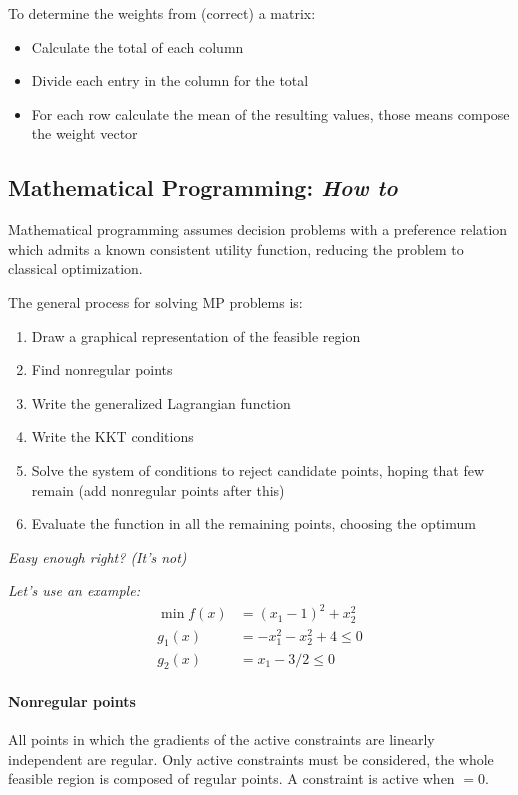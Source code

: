 To determine the weights from (correct) a matrix: 
\begin{itemize}
	\item Calculate the total of each column
	
	\item Divide each entry in the column for the total
	
	\item For each row calculate the mean of the resulting values, those means compose the weight vector
\end{itemize}

\subsection{Mathematical Programming: \textit{How to}}

Mathematical programming assumes decision problems with a preference relation which admits a known consistent utility function, reducing the problem to classical optimization. 

The general process for solving MP problems is: 
\begin{enumerate}
	\item Draw a graphical representation of the feasible region
	
	\item Find nonregular points
	
	\item Write the generalized Lagrangian function
	
	\item Write the KKT conditions
	
	\item Solve the system of conditions to reject candidate points, hoping that few remain (add nonregular points after this)
	
	\item Evaluate the function in all the remaining points, choosing the optimum
\end{enumerate}

\textit{Easy enough right? (It's not)}

\textit{Let's use an example:
\begin{align*}
	\min f(x) & = (x_1 - 1)^2 + x_2^2 \\
	g_1 (x) & = -x_1^2 -x_2^2 + 4 \leq 0 \\
	g_2 (x) & = x_1 - 3/2 \leq 0
\end{align*}}

\paragraph{Nonregular points} All points in which the gradients of the active constraints are linearly independent are regular. Only active constraints must be considered, the whole feasible region is composed of regular points. A constraint is active when $= 0$. 

